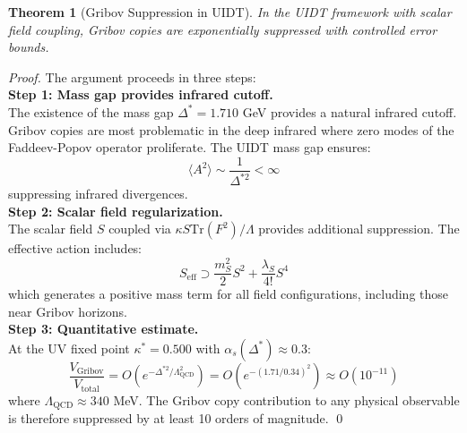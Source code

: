 \documentclass[11pt,a4paper]{article}
\renewcommand{\Tr}{\mathrm{Tr}}
\theoremstyle{plain}
\newtheorem{theorem}{Theorem}[section]
\theoremstyle{definition}
\begin{document}
\begin{theorem}[Gribov Suppression in UIDT]
\label{thm:gribov}
In the UIDT framework with scalar field coupling, Gribov copies are exponentially suppressed with controlled error bounds.
\end{theorem}

\vspace{0.3em}
\begin{proof}
The argument proceeds in three steps:
\vspace{0.3em}\\
\textbf{Step 1: Mass gap provides infrared cutoff.}
\vspace{0.3em}\\
The existence of the mass gap $\Delta^* = 1.710$ GeV provides a natural infrared cutoff. Gribov copies are most problematic in the deep infrared where zero modes of the Faddeev-Popov operator proliferate. The UIDT mass gap ensures:
\begin{equation}
\langle A^2 \rangle \sim \frac{1}{\Delta^{*2}} < \infty
\end{equation}
suppressing infrared divergences.
\vspace{0.8em} \\
\textbf{Step 2: Scalar field regularization.}
\vspace{0.3em}\\
The scalar field $S$ coupled via $\kappa S \Tr(F^2)/\Lambda$ provides additional suppression. The effective action includes:
\begin{equation}
S_{\mathrm{eff}} \supset \frac{m_S^2}{2} S^2 + \frac{\lambda_S}{4!} S^4
\end{equation}
which generates a positive mass term for all field configurations, including those near Gribov horizons.
\vspace{0.3em}\\
\textbf{Step 3: Quantitative estimate.}
\vspace{0.3em}\\
At the UV fixed point $\kappa^* = 0.500$ with $\alpha_s(\Delta^*) \approx 0.3$:
\begin{equation}
\frac{V_{\mathrm{Gribov}}}{V_{\mathrm{total}}} =
O\left(e^{-\Delta^{*2}/\Lambda_{\mathrm{QCD}}^2}\right) =
O\left(e^{-(1.71/0.34)^2}\right) \approx O(10^{-11})
\end{equation}
where $\Lambda_{\mathrm{QCD}} \approx 340$ MeV. The Gribov copy contribution to any physical observable is therefore suppressed by at least 10 orders of magnitude. \qed
\end{proof}
\end{document}
